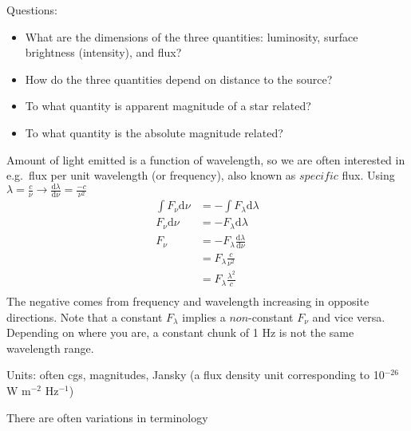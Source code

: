 \documentclass[12pt]{article}
\begin{document}
Questions:
\begin{itemize}
    \item What are the dimensions of the three quantities: luminosity,
        surface brightness (intensity), and flux?
    \item How do the three quantities depend on distance to the source?
    \item To what quantity is apparent magnitude of a star related?
    \item To what quantity is the absolute magnitude related?
\end{itemize}
Amount of light emitted is a function of wavelength,
so we are often interested
in e.g.\ flux per unit wavelength (or frequency),
also known as $specific$ flux.
Using $\lambda=\frac{c}{\nu} \rightarrow
\frac{\textrm{d}\lambda}{\textrm{d}\nu} = \frac{-c}{\nu^2}$
\begin{align*}
    \int F_{\nu} \textrm{d} \nu &= -\int F_{\lambda} \textrm{d} \lambda\\
    F_{\nu} \textrm{d} \nu &= -F_{\lambda} \textrm{d} \lambda\\
    F_{\nu} &= -F_{\lambda} \frac{\textrm{d} \lambda}{\textrm{d}\nu}\\
    &= F_{\lambda} \frac{c}{\nu^2}\\
    &= F_{\lambda} \frac{\lambda^2}{c}\\
\end{align*}
The negative comes from frequency and wavelength increasing in
opposite directions.
Note that a constant $F_{\lambda}$ implies a $non$-constant $F_{\nu}$
and vice versa. Depending on where you are, a constant chunk of 1 Hz is
not the same wavelength range.

Units: often cgs, magnitudes, Jansky (a flux density unit
corresponding to 10$^{-26}$ W m$^{-2}$ Hz$^{-1}$)

There are often variations in terminology
\end{document}
